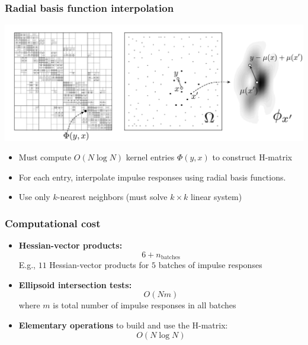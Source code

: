 \documentclass[10pt,final,xcolor=dvipsnames]{beamer}
\begin{document}
\begin{frame}
	\frametitle{Radial basis function interpolation}
	\begin{center}
 	\includegraphics[width=1.0\columnwidth]{frog_hmatrix_knn_impulse3.pdf}
	\end{center}
	\begin{itemize}
		\item Must compute $O(N \log N)$ kernel entries $\Phi(y,x)$ to construct H-matrix
		\item For each entry, interpolate impulse responses using radial basis functions.
		\item Use only $k$-nearest neighbors (must solve $k \times k$ linear system)
	\end{itemize}
\end{frame}

\begin{frame}
	\frametitle{Computational cost}
	\begin{itemize}
	  	\setlength\itemsep{2em}
		\item \textbf{Hessian-vector products:} 
		$$6 + n_\text{batches}$$
		E.g., $11$ Hessian-vector products for $5$ batches of impulse responses
		\item \textbf{Ellipsoid intersection tests:}
		$$O(Nm)$$
		where $m$ is total number of impulse responses in all batches
		\item \textbf{Elementary operations} to build and use the H-matrix:
		$$O(N \log N)$$ 
	\end{itemize}
\end{frame}



\end{document}
